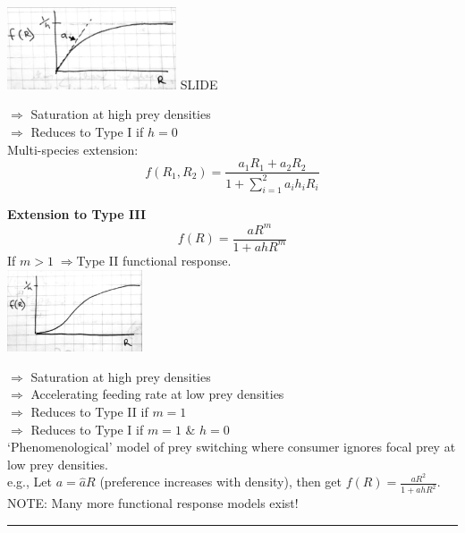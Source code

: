 \documentclass{article}
\newcommand{\note}[1]{\colorbox{gray!30}{#1}}
\newcommand{\ind}{\-\hspace{1cm}}
\begin{document}
\includegraphics[width=5cm]{figs/FR_T2.pdf} \note{SLIDE}

\ind $\Rightarrow$ Saturation at high prey densities\\
\ind $\Rightarrow$ Reduces to Type I if $h=0$\\

Multi-species extension:\\
\begin{equation*}
	f(R_1,R_2)=\frac{a_1 R_1 + a_2 R_2}{1+\sum_{i=1}^2 a_i h_i R_i}
\end{equation*}

\textbf{Extension to Type III}
\begin{equation*}
	f(R)=\frac{aR^m}{1+ahR^m}
\end{equation*}
\ind If $m>1\; \Rightarrow $Type II functional response.\\
\includegraphics[width=4cm]{figs/FR_T3.pdf}

\ind $\Rightarrow$ Saturation at high prey densities\\
\ind $\Rightarrow$ Accelerating feeding rate at low prey densities\\
\ind $\Rightarrow$ Reduces to Type II if $m=1$\\
\ind $\Rightarrow$ Reduces to Type I if $m=1$ \& $h=0$\\

`Phenomenological' model of prey switching where consumer ignores focal prey at low prey densities.\\
e.g., Let $a = \hat{a}R$ (preference increases with density), then get $f(R)=\frac{aR^2}{1+ahR^2}$.\\

\note{NOTE:}  Many more functional response models exist!

\rule[0.5ex]{\linewidth}{1pt}
\pagebreak
\end{document}
